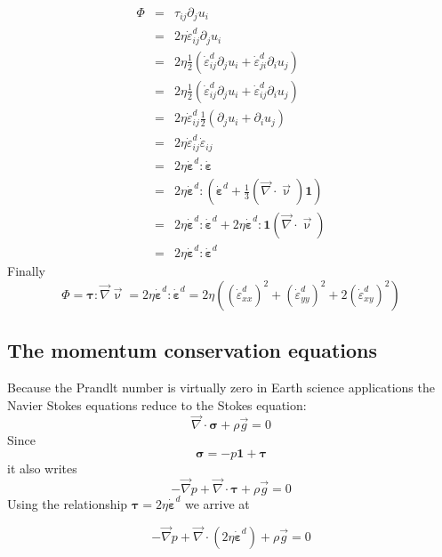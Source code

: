 \begin{eqnarray}
\Phi 
&=& \tau_{ij}\partial_j u_i \nonumber\\
&=& 2 \eta \dot{\varepsilon}_{ij}^d\partial_j u_i \nonumber\\
&=& 2 \eta \frac{1}{2}\left( \dot{\varepsilon}_{ij}^d\partial_j u_i + \dot{\varepsilon}_{ji}^d\partial_i u_j \right) \nonumber\\
&=& 2 \eta \frac{1}{2}\left( \dot{\varepsilon}_{ij}^d\partial_j u_i + \dot{\varepsilon}_{ij}^d\partial_i u_j \right) \nonumber\\
&=& 2 \eta  \dot{\varepsilon}_{ij}^d  \frac{1}{2}\left(\partial_j u_i + \partial_i u_j \right) \nonumber\\
&=& 2 \eta  \dot{\varepsilon}_{ij}^d   \dot{\varepsilon}_{ij} \nonumber\\
&=& 2 \eta  \dot{\bm \varepsilon}^d :  \dot{\bm \varepsilon} \nonumber\\
&=& 2 \eta  \dot{\bm \varepsilon}^d : \left( \dot{\bm \varepsilon}^d +\frac{1}{3} ({\vec \nabla}\cdot{\vec \upnu}) {\bm 1} \right)\nonumber\\
&=& 2 \eta  \dot{\bm \varepsilon}^d : \dot{\bm \varepsilon}^d 
+ 2 \eta  \dot{\bm \varepsilon}^d : {\bm 1} ({\vec \nabla}\cdot{\vec \upnu}) \nonumber\\ 
&=& 2 \eta  \dot{\bm \varepsilon}^d : \dot{\bm \varepsilon}^d 
\end{eqnarray}
Finally
\[
\Phi = {\bm \tau}:{\vec \nabla}{\vec \upnu} = 2 \eta  \dot{\bm \varepsilon}^d : \dot{\bm \varepsilon}^d
= 2 \eta \left( (\dot{\varepsilon}_{xx}^d)^2 + (\dot{\varepsilon}_{yy}^d)^2 + 2(\dot{\varepsilon}_{xy}^d)^2 \right)
\]

\subsection{The momentum conservation equations} 

Because the Prandlt number is virtually zero in Earth science applications the Navier Stokes 
equations reduce to the Stokes equation:
\begin{equation}
{\vec \nabla}\cdot {\bm \sigma} + \rho {\vec g} = 0
\end{equation}
Since 
\begin{equation}
{\bm \sigma} = -p {\bm 1} + {\bm \tau}
\end{equation}
it also writes
\begin{equation}
-{\vec \nabla}p + {\vec \nabla}\cdot {\bm \tau} + \rho {\vec g} = 0
\end{equation}
Using the relationship ${\bm \tau} = 2 \eta \dot{\bm \varepsilon}^d$ we arrive at 
\begin{mdframed}[backgroundcolor=blue!5]
\begin{equation}
-{\vec \nabla}p + {\vec \nabla}\cdot (2 \eta \dot{\bm \varepsilon}^d ) + \rho {\vec g} = 0
\end{equation}
\end{mdframed}

